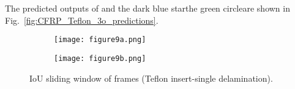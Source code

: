 \DIFaddend The predicted outputs of \DIFdelbegin {}\DIFdelend \DIFaddbegin {}\DIFaddend {} and \DIFdelbegin {}\DIFdelend \DIFaddbegin {}\DIFaddend {} \DIFdelbegin {}\DIFdelend \DIFaddbegin {}\DIFaddend the dark blue star\DIFdelbegin {}\DIFdelend \DIFaddbegin {}\DIFaddend the green circle\DIFaddbegin \DIFadd{) }\DIFaddend are shown in Fig.~\ref{fig:CFRP_Teflon_3o_predictions}.
\DIFaddbegin {}\DIFaddend %
\begin{figure} [!h]
	\begin{subfigure}[b]{1\textwidth}
		\centering
		\DIFdelbeginFL %
\DIFdelendFL \DIFaddbeginFL \texttt{[image: figure9a.png]}
		\DIFaddendFL \caption{\DIFaddbeginFL {}\DIFaddendFL }
		\label{fig:CFRP_Teflon_3o_IoU_}
	\end{subfigure}
	\par\medskip
	\begin{subfigure}[b]{1\textwidth}
		\centering
		\DIFdelbeginFL %
\DIFdelendFL \DIFaddbeginFL \texttt{[image: figure9b.png]}
		\DIFaddendFL \caption{\DIFaddbeginFL {}\DIFaddendFL } 
		\label{fig:CFRP_teflon_3o_shapes_}
	\end{subfigure}
	\caption{IoU \DIFdelbeginFL {}\DIFdelendFL \DIFaddbeginFL {}\DIFaddendFL sliding window of frames (Teflon insert-single delamination).}
	\label{fig:CFRP_Teflon_3o_IoU_centre_window}
\end{figure} 
